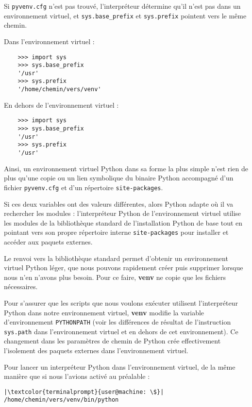 Si \texttt{pyvenv.cfg} n'est pas trouvé, l'interpréteur détermine qu'il n'est pas dans un environnement virtuel, et \texttt{sys.base\_prefix} et \texttt{sys.prefix} pointent vers le même chemin.

Dans l'environnement virtuel :
\begin{verbatim}
    >>> import sys
    >>> sys.base_prefix
    '/usr'
    >>> sys.prefix
    '/home/chemin/vers/venv'
\end{verbatim}

En dehors de l'environnement virtuel :
\begin{verbatim}
    >>> import sys
    >>> sys.base_prefix
    '/usr'
    >>> sys.prefix
    '/usr'
\end{verbatim}

Ainsi, un environnement virtuel Python dans sa forme la plus simple n'est rien de plus qu’une copie ou un lien symbolique du binaire Python accompagné d’un fichier \texttt{pyvenv.cfg} et d’un répertoire \texttt{site-packages}. 

Si ces deux variables ont des valeurs différentes, alors Python adapte où il va rechercher les modules : l’interpréteur Python de l'environnement virtuel utilise les modules de la bibliothèque standard de l'installation Python de base tout en pointant vers son propre répertoire interne \texttt{site-packages} pour installer et accéder aux paquets externes.

Le renvoi vers la bibliothèque standard permet d'obtenir un environnement virtuel Python léger, que nous pouvons rapidement créer puis supprimer lorsque nous n’en n'avons plus besoin. Pour ce faire, \textbf{venv} ne copie que les fichiers nécessaires.

Pour s’assurer que les scripts que nous voulons exécuter utilisent l’interpréteur Python dans notre environnement virtuel, \textbf{venv} modifie la variable d’environnement \texttt{PYTHONPATH} (voir les différences de résultat de l'instruction \texttt{sys.path} dans l'environnement virtuel et en dehors de cet environnement). Ce changement dans les paramètres de chemin de Python crée effectivement l’isolement des paquets externes dans l'environnement virtuel.

Pour lancer un interpréteur Python dans l'environnement virtuel, de la même manière que si nous l'avions activé au préalable :
\begin{lstlisting}[style=terminal]
|\textcolor{terminalprompt}{user@machine: \$}| /home/chemin/vers/venv/bin/python
\end{lstlisting}

